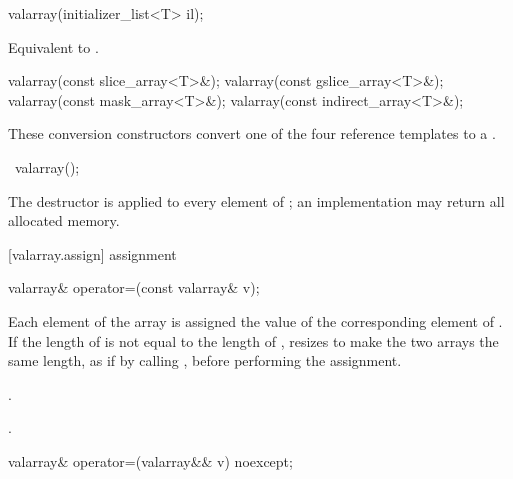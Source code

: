 %
\begin{itemdecl}
valarray(initializer_list<T> il);
\end{itemdecl}

\begin{itemdescr}
\pnum
\effects Equivalent to .
\end{itemdescr}

%
\begin{itemdecl}
valarray(const slice_array<T>&);
valarray(const gslice_array<T>&);
valarray(const mask_array<T>&);
valarray(const indirect_array<T>&);
\end{itemdecl}

\begin{itemdescr}
\pnum
These conversion constructors convert one of the four reference templates
to a
.
\end{itemdescr}

%
\begin{itemdecl}
~valarray();
\end{itemdecl}

\begin{itemdescr}
\pnum
\effects
The destructor is applied to every element of
;
an implementation may return all allocated memory.
\end{itemdescr}

[valarray.assign]{ assignment}

%
\begin{itemdecl}
valarray& operator=(const valarray& v);
\end{itemdecl}

\begin{itemdescr}
\pnum
\effects
Each element of the
array is assigned the value of the corresponding element of .
If the length of  is not equal to the length of ,
resizes  to make the two arrays the same length,
as if by calling , before performing the assignment.

\pnum
\postconditions {}.

\pnum
\returns {}.
\end{itemdescr}

%
\begin{itemdecl}
valarray& operator=(valarray&& v) noexcept;
\end{itemdecl}

